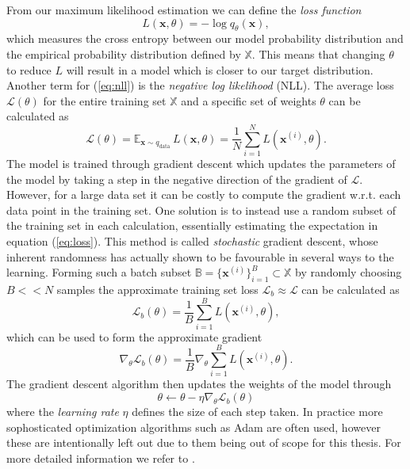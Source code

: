\documentclass{article}
\begin{document}
From our maximum likelihood estimation we can define the \textit{loss function}
\begin{equation} \label{eq:nll}
    L(\bm{x}, \theta) = -\log q_{\theta}(\bm{x}),
\end{equation}
which measures the cross entropy between our model probability distribution and the empirical probability distribution defined by $\mathbb{X}$. This means that changing $\theta$ to reduce $L$ will result in a model which is closer to our target distribution. Another term for (\ref{eq:nll}) is the \textit{negative log likelihood} (NLL). The average loss $\mathcal{L}(\theta)$ for the entire training set $\mathbb{X}$ and a specific set of weights $\theta$ can be calculated as
\begin{equation} \label{eq:loss}
    \mathcal{L}(\theta) = \mathbb{E}_{\bm{x}\sim q_{\text{data}}} \, L(\bm{x}, \theta) = 
    \frac{1}{N} \sum_{i=1}^{N} L(\bm{x}^{(i)}, \theta).
\end{equation}
The model is trained through gradient descent which updates the parameters of the model by taking a step in the negative direction of the gradient of $\mathcal{L}$. However, for a large data set it can be costly to compute the gradient w.r.t. each data point in the training set. One solution is to instead use a random subset of the training set in each calculation, essentially estimating the expectation in equation (\ref{eq:loss}). This method is called \textit{stochastic} gradient descent, whose inherent randomness has actually shown to be favourable in several ways to the learning. Forming such a batch subset $\mathbb{B}=\{\bm{x}^{(i)}\}_{i=1}^{B} \subset \mathbb{X}$ by randomly choosing $B << N$ samples the approximate training set loss $\mathcal{L}_b \approx \mathcal{L}$ can be calculated as
\begin{equation}
    \mathcal{L}_{b}(\theta) = \frac{1}{B}\sum_{i=1}^B L(\bm{x}^{(i)}, \theta),
\end{equation}
which can be used to form the approximate gradient
\begin{equation} \label{eq:nabla}
    \nabla_{\theta} \mathcal{L}_b(\theta) = \frac{1}{B} \nabla_{\theta} \sum_{i=1}^B L(\bm{x}^{(i)}, \theta).
\end{equation}
The gradient descent algorithm then updates the weights of the model through
\begin{equation}
    \theta \leftarrow \theta - \eta \nabla_{\theta} \mathcal{L}_b(\theta)
\end{equation}
where the \textit{learning rate} $\eta$ defines the size of each step taken. In practice more sophosticated optimization algorithms such as Adam are often used, however these are intentionally left out due to them being out of scope for this thesis. For more detailed information we refer to \cite{kingma2014adam, ruder2016overview}.
\end{document}
